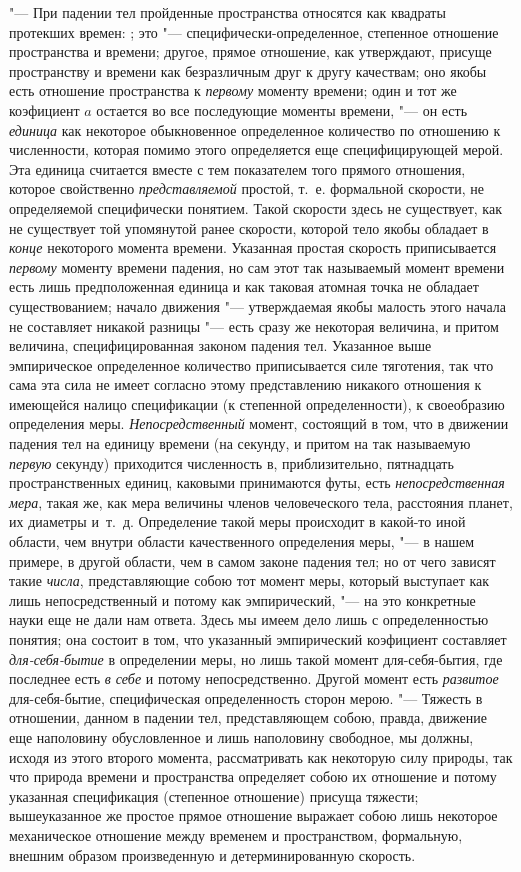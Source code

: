 "--- При падении тел пройденные пространства относятся как квадраты протекших
времен: ; это "--- специфически-определенное, степенное отношение пространства
и времени; другое, прямое отношение, как утверждают, присуще пространству и
времени как безразличным друг к другу качествам; оно якобы есть отношение
пространства к {\em первому} моменту времени; один и
тот же коэфициент $a$ остается во все последующие
моменты времени, "--- он есть {\em единица} как некоторое
обыкновенное определенное количество по отношению к численности, которая
помимо этого определяется еще специфицирующей мерой. Эта единица считается
вместе с тем показателем того прямого отношения, которое свойственно
{\em представляемой} простой, т.~е. формальной
скорости, не определяемой специфически понятием. Такой скорости здесь не
существует, как не существует той упомянутой ранее скорости, которой тело
якобы обладает в {\em конце} некоторого момента
времени. Указанная простая скорость приписывается
{\em первому} моменту времени падения, но сам этот так
называемый момент времени есть лишь предположенная единица и как таковая
атомная точка не обладает существованием; начало движения "--- утверждаемая
якобы малость этого начала не составляет никакой разницы "--- есть сразу же
некоторая величина, и притом величина, специфицированная законом падения
тел. Указанное выше эмпирическое определенное количество приписывается силе
тяготения, так что сама эта сила не имеет согласно этому представлению
никакого отношения к имеющейся налицо спецификации (к степенной
определенности), к своеобразию определения меры.
{\em Непосредственный} момент, состоящий в том, что в
движении падения тел на единицу времени (на секунду, и притом на так
называемую {\em первую} секунду) приходится численность
в, приблизительно, пятнадцать пространственных единиц, каковыми принимаются
футы, есть {\em непосредственная мера}, такая же, как
мера величины членов человеческого тела, расстояния планет, их диаметры
и~т.~д. Определение такой меры происходит в какой-то иной области, чем
внутри области качественного определения меры, "--- в нашем примере, в другой
области, чем в самом законе падения тел; но от чего зависят такие
{\em числа}, представляющие собою тот момент меры,
который выступает как лишь непосредственный и потому как эмпирический, "--- на
это конкретные науки еще не дали нам ответа. Здесь мы имеем дело лишь с
определенностью понятия; она состоит в том, что указанный эмпирический
коэфициент составляет {\em для-себя-бытие} в
определении меры, но лишь такой момент для-себя-бытия, где последнее есть
{\em в себе} и потому непосредственно. Другой момент
есть {\em развитое} для-себя-бытие, специфическая
определенность сторон мерою. "--- Тяжесть в отношении, данном в падении тел,
представляющем собою, правда, движение еще наполовину обусловленное и лишь
наполовину свободное, мы должны, исходя из этого второго момента,
рассматривать как некоторую силу природы, так что природа времени и
пространства определяет собою их отношение и потому указанная спецификация
(степенное отношение) присуща тяжести; вышеуказанное же простое прямое
отношение выражает собою лишь некоторое механическое отношение между
временем и пространством, формальную, внешним образом произведенную и
детерминированную скорость.

